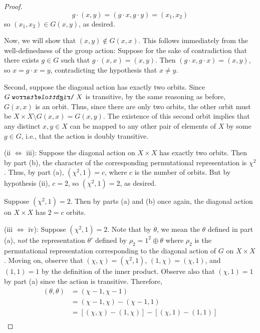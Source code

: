 \documentclass[../psets.tex]{subfiles}
\begin{document}
\begin{enumerate}
\begin{enumerate}
\begin{proof}
            \begin{equation*}
                g\cdot(x,y) = (g\cdot x,g\cdot y) = (x_1,x_2)
            \end{equation*}
            so $(x_1,x_2)\in G(x,y)$, as desired.\par
            Now, we will show that $(x,y)\notin G(x,x)$. This follows immediately from the well-definedness of the group action: Suppose for the sake of contradiction that there exists $g\in G$ such that $g\cdot(x,x)=(x,y)$. Then $(g\cdot x,g\cdot x)=(x,y)$, so $x=g\cdot x=y$, contradicting the hypothesis that $x\neq y$.\par\smallskip
            Second, suppose the diagonal action has exactly two orbits. Since $G\acts X$ is transitive, by the same reasoning as before, $G(x,x)$ is an orbit. Thus, since there are only two orbits, the other orbit must be $X\times X\setminus G(x,x)=G(x,y)$. The existence of this second orbit implies that any distinct $x,y\in X$ can be mapped to any other pair of elements of $X$ by some $g\in G$, i.e., that the action is doubly transitive.\par\medskip
            (ii $\Leftrightarrow$ iii): Suppose the diagonal action on $X\times X$ has exactly two orbits. Then by part (b), the character of the corresponding permutational representation is $\chi^2$. Thus, by part (a), $(\chi^2,1)=c$, where $c$ is the number of orbits. But by hypothesis (ii), $c=2$, so $(\chi^2,1)=2$, as desired.\par\smallskip
            Suppose $(\chi^2,1)=2$. Then by parts (a) and (b) once again, the diagonal action on $X\times X$ has $2=c$ orbits.\par\medskip
            (iii $\Leftrightarrow$ iv): Suppose $(\chi^2,1)=2$. Note that by $\theta$, we mean the $\theta$ defined in part (a), \emph{not} the representation $\theta'$ defined by $\rho_2=1^2\oplus\theta$ where $\rho_2$ is the permutational representation corresponding to the diagonal action of $G$ on $X\times X$. Moving on, observe that $(\chi,\chi)=(\chi^2,1)$, $(1,\chi)=(\chi,1)$, and $(1,1)=1$ by the definition of the inner product. Observe also that $(\chi,1)=1$ by part (a) since the action is transitive. Therefore,
            \begin{align*}
                (\theta,\theta) &= (\chi-1,\chi-1)\\
                &= (\chi-1,\chi)-(\chi-1,1)\\
                &= [(\chi,\chi)-(1,\chi)]-[(\chi,1)-(1,1)]\\

\end{align*}
\end{proof}
\end{enumerate}
\end{enumerate}
\end{document}
